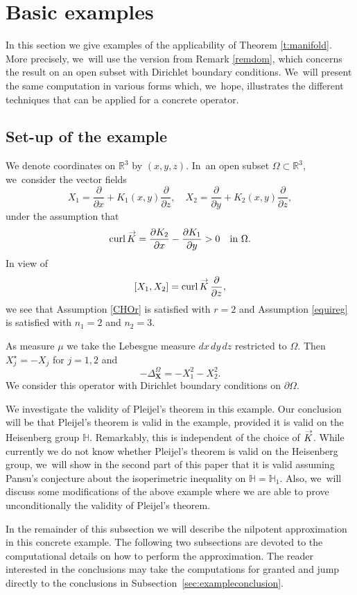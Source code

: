 \documentclass[11pt]{article}
\DeclareMathOperator{\curl}{curl}
\newcommand{\bX}{{\boldsymbol{X}}}
\renewcommand{\vec}[1]
{\overset{\,{\raisebox{-2pt}{$\scriptstyle\to$}}}{#1}}
\theoremstyle{definition}
\newcommand{\1}{\mathbbm{1}}
\newcommand{\R}{\mathbb{R}}
\numberwithin{equation}{section}
\begin{document}
\section{Basic examples}\label{AppA}

In this section we give examples of the applicability of Theorem \ref{t:manifold}. More precisely, we~will use the version from Remark \ref{remdom}, which concerns the result on an open subset with Dirichlet boundary conditions. We~will present the same computation in various forms which, we~hope, illustrates the different techniques that can be applied for a concrete operator.

\subsection{Set-up of the example}
We denote coordinates on $\R^3$ by $(x,y,z)$. In~an open subset $\Omega\subset\R^3$, we~consider the vector fields
\[
X_1= \frac{\partial}{\partial x} + K_1(x,y) \frac{\partial}{\partial z},
\quad
X_2= \frac{\partial}{\partial y} + K_2 (x,y) \frac{\partial}{\partial z},
\]
under the assumption that
\[
\curl \vec K = \frac{\partial K_2}{\partial x} - \frac{\partial K_1}{\partial y} >0
\quad\text{in}\ \Omega.
\]
In view of
\[
[X_1,X_2] = \curl \vec K \,\frac{\partial}{\partial z},
\]
we see that Assumption \ref{CHOr} is satisfied with $r=2$ and Assumption \ref{equireg} is satisfied with $n_1=2$ and $n_2=3$.

As measure $\mu$ we take the Lebesgue measure $dx\,dy\,dz$ restricted to $\Omega$. Then $X_j^\star = - X_j$ for $j=1,2$ and
\[
-\Delta_\bX^\Omega = - X_1^2- X_2^2.
\]
We consider this operator with Dirichlet boundary conditions on $\partial\Omega$.

We investigate the validity of Pleijel's theorem in this example. Our conclusion will be that Pleijel's theorem is valid in the example, provided it is valid on the Heisenberg group $\mathbb H$. Remarkably, this is independent of the choice of $\vec K$. While currently we do not know whether Pleijel's theorem is valid on the Heisenberg group, we~will show in the second part of this paper that it is valid assuming Pansu's conjecture about the isoperimetric inequality on $\mathbb H=\mathbb H_1$. Also, we~will discuss some modifications of the above example where we are able to prove unconditionally the validity of Pleijel's theorem.

In the remainder of this subsection we will describe the nilpotent approximation in this concrete example. The following two subsections are devoted to the computational details on how to perform the approximation. The reader interested in the conclusions may take the computations for granted and jump directly to the conclusions in Subsection~\ref{sec:exampleconclusion}.
\end{document}
